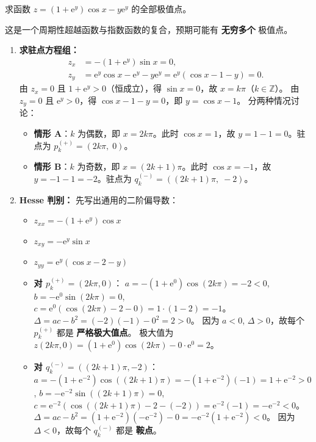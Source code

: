 \documentclass[lang=cn,11pt]{elegantbook}
\begin{document}
\begin{example}[超越函数的无穷多极值点] \label{ex:trig-exp-extreme}
求函数 $z=(1+\mathrm{e}^{y})\cos x-y\mathrm{e}^{y}$ 的全部极值点。
\end{example}

\begin{solution}
这是一个周期性超越函数与指数函数的复合，预期可能有 \textbf{无穷多个} 极值点。

\begin{enumerate}
  \item \textbf{求驻点方程组：}
  \begin{align*}
  z_x &= -(1+\mathrm{e}^{y})\sin x = 0,\\
  z_y &= \mathrm{e}^{y}\cos x - \mathrm{e}^{y} - y\mathrm{e}^{y} = \mathrm{e}^{y}(\cos x - 1 - y) = 0.
  \end{align*}
  由 $z_x=0$ 且 $1+\mathrm{e}^{y}>0$（恒成立），得 $\sin x=0$，故 $x=k\pi$（$k\in\mathbb Z$）。
  由 $z_y=0$ 且 $\mathrm{e}^{y}>0$，得 $\cos x-1-y=0$，即 $y=\cos x-1$。
  分两种情况讨论：
  \begin{itemize}
    \item \textbf{情形 A}：$k$ 为偶数，即 $x=2k\pi$。此时 $\cos x = 1$，故 $y=1-1=0$。驻点为 $p_k^{(+)}=(2k\pi,\;0)$。
    \item \textbf{情形 B}：$k$ 为奇数，即 $x=(2k+1)\pi$。此时 $\cos x = -1$，故 $y=-1-1=-2$。驻点为 $q_k^{(-)}=((2k+1)\pi,\;-2)$。
  \end{itemize}

  \item \textbf{Hesse 判别：}
  先写出通用的二阶偏导数：
  \begin{itemize}
    \item $z_{xx}=-(1+\mathrm{e}^{y})\cos x$
    \item $z_{xy}=-\mathrm{e}^{y}\sin x$
    \item $z_{yy}=\mathrm{e}^{y}(\cos x-2-y)$
  \end{itemize}
  \begin{itemize}
    \item \textbf{对 $p_k^{(+)}=(2k\pi,0)$}：
          $a=-(1+\mathrm{e}^0)\cos(2k\pi)=-2 < 0$, $b=-\mathrm{e}^0\sin(2k\pi)=0$, $c=\mathrm{e}^0(\cos(2k\pi)-2-0)=1\cdot(1-2)=-1$。
          $\Delta=ac-b^2=(-2)(-1)-0^2=2>0$。
          因为 $a<0$, $\Delta>0$，故每个 $p_k^{(+)}$ 都是 \textbf{严格极大值点}。
          极大值为 $z(2k\pi,0)=(1+\mathrm{e}^0)\cos(2k\pi)-0\cdot \mathrm{e}^0=2$。
    \item \textbf{对 $q_k^{(-)}=((2k+1)\pi,-2)$}：
          $a=-(1+\mathrm{e}^{-2})\cos((2k+1)\pi)=-(1+\mathrm{e}^{-2})(-1)=1+\mathrm{e}^{-2}>0$, $b=-\mathrm{e}^{-2}\sin((2k+1)\pi)=0$, $c=\mathrm{e}^{-2}(\cos((2k+1)\pi)-2-(-2))=\mathrm{e}^{-2}(-1)=-\mathrm{e}^{-2} < 0$。
          $\Delta=ac-b^2=(1+\mathrm{e}^{-2})(-\mathrm{e}^{-2})-0=-\mathrm{e}^{-2}(1+\mathrm{e}^{-2})<0$。
          因为 $\Delta<0$，故每个 $q_k^{(-)}$ 都是 \textbf{鞍点}。
  \end{itemize}


\end{enumerate}
\end{solution}
\end{document}
